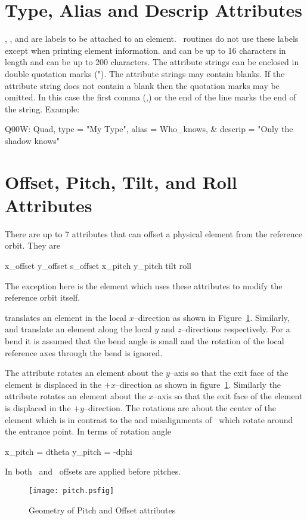 \section{Type, Alias and Descrip Attributes}
\label{s:string}

, , and  are labels to be attached 
to an element. \bmad\ routines do not use these labels except 
when printing element information. 
and  can be up to 16 characters in length and 
can be up to 200 characters. The attribute strings can be enclosed in
double quotation marks ("). The attribute strings may contain
blanks. If the attribute string does not contain a blank then the
quotation marks may be omitted. In this case the first comma (,) or
the end of the line marks the end of the string. Example:
\begin{example}
  Q00W: Quad, type = "My Type", alias = Who_knows, &
                                  descrip = "Only the shadow knows"
\end{example}

\section{Offset, Pitch, Tilt, and Roll Attributes}
\label{s:offset}

There are up to 7 attributes that can offset a physical element
from the reference orbit. They are
\begin{example}
  x\_offset
  y\_offset
  s\_offset
  x\_pitch
  y\_pitch
  tilt
  roll
\end{example}
The exception here is the  element which uses these
attributes to modify the reference orbit itself.

 translates an element in the local $x$--direction
as shown in Figure~\ref{f:pitch}. Similarly,  and 
 translate an element along the local $y$ and 
$z$--directions respectively. For a bend it is assumed that
the bend angle is small and the rotation of the local reference
axes through the bend is ignored.

The  attribute rotates an element about the $y$--axis
so that the exit face of the element is displaced in the 
$+x$--direction as shown in figure~\ref{f:pitch}. Similarly
the  attribute rotates an element about the $x$--axis
so that the exit face of the element is displaced in the 
$+y$--direction. The rotations
are about the center of the element which is in contrast to the 
 and  misalignments of \mad\ which rotate
around the entrance point. In terms of rotation angle
\begin{example}
  x_pitch =  dtheta
  y_pitch = -dphi
\end{example}
In both \bmad\ and \mad\ offsets are applied before pitches.
\begin{figure}
  \centering
  \texttt{[image: pitch.psfig]}
  \caption{Geometry of Pitch and Offset attributes}
  \label{f:pitch}
\end{figure}

